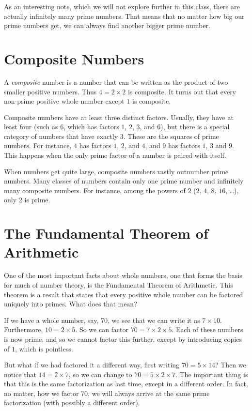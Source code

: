 \documentclass[a4paper,10pt]{report}
\begin{document}
As an interesting note, which we will not explore further in this class, there
are actually infinitely many prime numbers. That means that no matter how big
our prime numbers get, we can always find another bigger prime number.

\section{Composite Numbers}

A \emph{composite} number is a number that can be written as the product of two
smaller positive numbers. Thus $4=2\times2$ is composite. It turns out that
every non-prime positive whole number except $1$ is composite.

Composite numbers have at least three distinct factors. Usually, they have at
least four (such as $6$, which has factors $1$, $2$, $3$, and $6$), but there is
a special category of numbers that have exactly $3$. These are the squares of
prime numbers. For instance, $4$ has factors $1$, $2$, and $4$, and $9$ has
factors $1$, $3$ and $9$. This happens when the only prime factor of a number is
paired with itself.

When numbers get quite large, composite numbers vastly outnumber prime numbers.
Many classes of numbers contain only one prime number and infinitely many
composite numbers. For instance, among the powers of $2$ ($2$, $4$, $8$, $16$,
\dots), only $2$ is prime.

\section{The Fundamental Theorem of Arithmetic}

One of the most important facts about whole numbers, one that forms the basis
for much of number theory, is the Fundamental Theorem of Arithmetic. This
theorem is a result that states that every positive whole number can be factored
uniquely into primes. What does that mean?

If we have a whole number, say, $70$, we see that we can write it as
$7\times10$. Furthermore, $10=2\times5$. So we can factor $70=7\times2\times5$.
Each of these numbers is now prime, and so we cannot factor this further, except
by introducing copies of $1$, which is pointless.

But what if we had factored it a different way, first writing $70=5\times14$?
Then we notice that $14=2\times7$, so we can change to $70=5\times2\times7$. The
important thing is that this is the same factorization as last time, except in a
different order. In fact, no matter, how we factor $70$, we will always arrive
at the same prime factorization (with possibly a different order).
\end{document}
